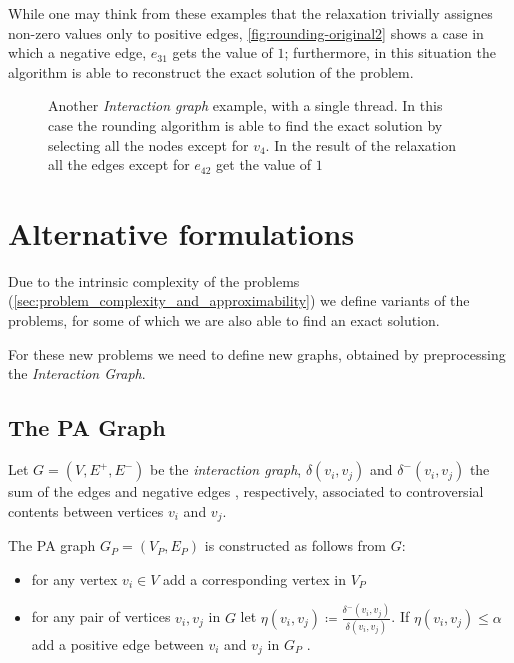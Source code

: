 While one may think from these examples that the relaxation trivially assignes
non-zero values only to positive edges, \autoref{fig:rounding-original2} shows
a case in which a negative edge, $e_{31}$ gets the value of $1$; furthermore,
in this situation the algorithm is able to reconstruct the exact solution of the problem.

\begin{figure}
	\centering
	\caption[Example of rounding algorithm finding the exact solution]{Another \emph{Interaction graph} example, with a single thread. In
		this case the rounding algorithm is able to find the exact solution by
		selecting all the nodes except for $v_4$. In the result of the
		relaxation all the edges except for $e_{42}$ get the value of $1$}%
	\label{fig:rounding-original2}
\end{figure}

\section{Alternative formulations}%
\label{sec:alternative-formulations}

Due to the intrinsic complexity of the problems
(\autoref{sec:problem_complexity_and_approximability}) we define variants of
the problems, for some of which we are also able to find an exact solution.

For these new problems we need to define new graphs, obtained by preprocessing
the \emph{Interaction Graph}.

\subsection{The \acrlong{PA} Graph}%
\label{sub:pa-graph}

Let $G = (V, E^{+}, E^{-})$ be the \emph{interaction graph}, $\delta(v_{i}, v_{j})$ and
$\delta^{-} (v_{i}, v_{j})$ the sum of the edges and negative edges , respectively,
associated to controversial contents between vertices $v_{i} $ and $v_{j} $.

\bigskip

The \acrfull{PA} graph $G_P = (V_{P}, E_{P}) $ is constructed as follows from
$G$:

\begin{itemize}
	\item for any vertex $v_{i} \in V$ add a corresponding vertex in $V_{P} $
	\item for any pair of vertices $v_i, v_j$ in $G$ let $\eta(v_i,v_j)
		      \coloneqq \frac{\delta^{-} (v_i,v_j)}{\delta (v_i,v_j)} $. If
	      $\eta(v_i,v_j) \leq \alpha $ add a positive edge between $v_{i} $ and
	      $v_{j} $ in $G_{P} $ \footnotemark.
\end{itemize}

